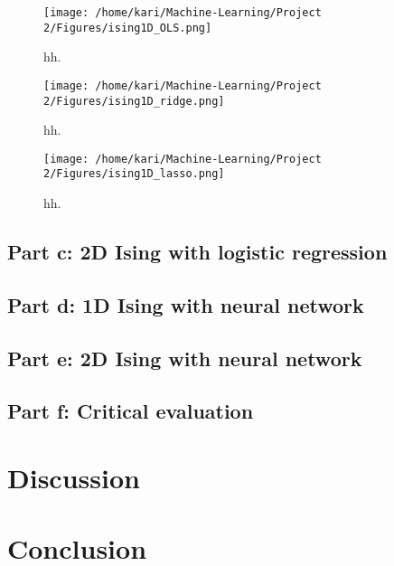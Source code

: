 \documentclass[a4paper,12pt, english]{article}
\begin{document}
\begin{figure}
\centering
\texttt{[image: /home/kari/Machine-Learning/Project 2/Figures/ising1D\_OLS.png]}
\caption{hh.}
\label{fig:OLS}
\end{figure}

\begin{figure}
\centering
\texttt{[image: /home/kari/Machine-Learning/Project 2/Figures/ising1D\_ridge.png]}
\caption{hh.}
\label{fig:ridge}
\end{figure}

\begin{figure}
\centering
\texttt{[image: /home/kari/Machine-Learning/Project 2/Figures/ising1D\_lasso.png]}
\caption{hh.}
\label{fig:lasso}
\end{figure}


\subsection{Part c: 2D Ising with logistic regression}

\subsection{Part d: 1D Ising with neural network}

\subsection{Part e: 2D Ising with neural network}

\subsection{Part f: Critical evaluation}

\section{Discussion}

\section{Conclusion}

\newpage
\end{document}

